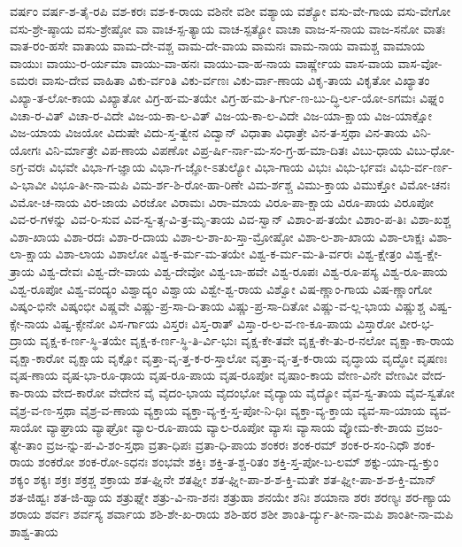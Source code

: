 {ವರ್ಷಂ
ವರ್ಷ-ಶ-ತೈ-ರಪಿ
ವಶ-ಕರಃ
ವಶ-ಕ-ರಾಯ
ವಶಿನೇ
ವಶೀ
ವಶ್ಯಾಯ
ವಶ್ಯೋ
ವಸು-ವೇ-ಗಾಯ
ವಸು-ವೇಗೋ
ವಸು-ಶ್ರೇ-ಷ್ಠಾಯ
ವಸು-ಶ್ರೇಷ್ಠೋ
ವಾ
ವಾಚ-ಸ್ಪ-ತ್ಯಾಯ
ವಾಚ-ಸ್ಪತ್ಯೋ
ವಾಚಾ
ವಾಜ-ಸ-ನಾಯ
ವಾಜ-ಸನೋ
ವಾತಃ
ವಾತ-ರಂ-ಹಸೇ
ವಾತಾಯ
ವಾಮ-ದೇ-ವಶ್ಚ
ವಾಮ-ದೇ-ವಾಯ
ವಾಮನಃ
ವಾಮ-ನಾಯ
ವಾಮಶ್ಚ
ವಾಮಾಯ
ವಾಯುಃ
ವಾಯು-ರ-ರ್ಯಮಾ
ವಾಯು-ವಾ-ಹನಃ
ವಾಯು-ವಾ-ಹ-ನಾಯ
ವಾರ್ಷ್ಣೇಯ
ವಾಸ-ವಾಯ
ವಾಸ-ವೋ-ಽಮರಃ
ವಾಸು-ದೇವ
ವಾಹಿತಾ
ವಿಕು-ರ್ವಂತಿ
ವಿಕು-ರ್ವಣಃ
ವಿಕು-ರ್ವಾ-ಣಾಯ
ವಿಕೃ-ತಾಯ
ವಿಕೃತೋ
ವಿಖ್ಯಾತಂ
ವಿಖ್ಯಾ-ತ-ಲೋ-ಕಾಯ
ವಿಖ್ಯಾತೋ
ವಿಗ್ರ-ಹ-ಮ-ತಯೇ
ವಿಗ್ರ-ಹ-ಮ-ತಿ-ರ್ಗು-ಣ-ಬು-ದ್ಧಿ-ರ್ಲ-ಯೋ-ಽಗಮಃ
ವಿಘ್ನಂ
ವಿಚಾ-ರ-ವಿತ್
ವಿಚಾ-ರ-ವಿದೇ
ವಿಜ-ಯ-ಕಾ-ಲ-ವಿತ್
ವಿಜ-ಯ-ಕಾ-ಲ-ವಿದೇ
ವಿಜ-ಯಾ-ಕ್ಷಾಯ
ವಿಜ-ಯಾಕ್ಷೋ
ವಿಜ-ಯಾಯ
ವಿಜಯೋ
ವಿದುಷೇ
ವಿದು-ಸ್ತ-ತ್ವೇನ
ವಿದ್ವಾನ್
ವಿಧಾತಾ
ವಿಧಾತ್ರೇ
ವಿನ-ತ-ಸ್ತಥಾ
ವಿನ-ತಾಯ
ವಿನಿ-ಯೋಗಃ
ವಿನಿ-ರ್ಮಾತ್ರೇ
ವಿಪ-ಣಾಯ
ವಿಪಣೋ
ವಿಪ್ರ-ರ್ಷಿ-ರ್ನಾ-ಮ-ಸಂ-ಗ್ರ-ಹ-ಮಾ-ದಿತಃ
ವಿಬು-ಧಾಯ
ವಿಬು-ಧೋ-ಽಗ್ರ-ವರಃ
ವಿಭವೇ
ವಿಭಾ-ಗ-ಜ್ಞಾಯ
ವಿಭಾ-ಗ-ಜ್ಞೋ-ಽತುಲ್ಯೋ
ವಿಭಾ-ಗಾಯ
ವಿಭುಃ
ವಿಭು-ರ್ಭವಃ
ವಿಭು-ರ್ವ-ರ್ಣ-ವಿ-ಭಾವೀ
ವಿಭೂ-ತೀ-ನಾ-ಮಪಿ
ವಿಮ-ರ್ಶ-ಶಿ-ರೋ-ಹಾ-ರಿಣೇ
ವಿಮ-ರ್ಶಶ್ಚ
ವಿಮು-ಕ್ತಾಯ
ವಿಮುಕ್ತೋ
ವಿಮೋ-ಚನಃ
ವಿಮೋ-ಚ-ನಾಯ
ವಿರ-ಜಾಯ
ವಿರಜೋ
ವಿರಾಮಃ
ವಿರಾ-ಮಾಯ
ವಿರೂ-ಪಾ-ಕ್ಷಾಯ
ವಿರೂ-ಪಾಯ
ವಿರೂಪೋ
ವಿವ-ರ-ಗಳನ್ನು
ವಿವ-ರಿ-ಸುವ
ವಿವ-ಸ್ವ-ತ್ಸ-ವಿ-ತ್ರ-ಮೃ-ತಾಯ
ವಿವ-ಸ್ವಾನ್
ವಿಶಾಂ-ಪ-ತಯೇ
ವಿಶಾಂ-ಪ-ತಿಃ
ವಿಶಾ-ಖಶ್ಚ
ವಿಶಾ-ಖಾಯ
ವಿಶಾ-ರದಃ
ವಿಶಾ-ರ-ದಾಯ
ವಿಶಾ-ಲ-ಶಾ-ಖ-ಸ್ತಾ-ಮ್ರೋಷ್ಠೋ
ವಿಶಾ-ಲ-ಶಾ-ಖಾಯ
ವಿಶಾ-ಲಾಕ್ಷಃ
ವಿಶಾ-ಲಾ-ಕ್ಷಾಯ
ವಿಶಾ-ಲಾಯ
ವಿಶಾಲೋ
ವಿಶ್ವ-ಕ-ರ್ಮ-ಮ-ತಯೇ
ವಿಶ್ವ-ಕ-ರ್ಮ-ಮ-ತಿ-ರ್ವರಃ
ವಿಶ್ವ-ಕ್ಷೇತ್ರಂ
ವಿಶ್ವ-ಕ್ಷೇ-ತ್ರಾಯ
ವಿಶ್ವ-ದೇವಃ
ವಿಶ್ವ-ದೇ-ವಾಯ
ವಿಶ್ವ-ದೇವೋ
ವಿಶ್ವ-ಬಾ-ಹವೇ
ವಿಶ್ವ-ರೂಪಃ
ವಿಶ್ವ-ರೂ-ಪಸ್ಯ
ವಿಶ್ವ-ರೂ-ಪಾಯ
ವಿಶ್ವ-ರೂಪೋ
ವಿಶ್ವ-ವಂದ್ಯಂ
ವಿಶ್ವಾದ್ಯಂ
ವಿಶ್ವಾಯ
ವಿಶ್ವೇ-ಶ್ವ-ರಾಯ
ವಿಶ್ವೋ
ವಿಷ-ಣ್ಣಾಂ-ಗಾಯ
ವಿಷ-ಣ್ಣಾಂಗೋ
ವಿಷ್ಕಂ-ಭಿನೇ
ವಿಷ್ಕಂಭೀ
ವಿಷ್ಣವೇ
ವಿಷ್ಣು-ಪ್ರ-ಸಾ-ದಿ-ತಾಯ
ವಿಷ್ಣು-ಪ್ರ-ಸಾ-ದಿತೋ
ವಿಷ್ಣು-ವ-ಲ್ಲ-ಭಾಯ
ವಿಷ್ಣುಶ್ಚ
ವಿಷ್ವ-ಕ್ಸೇ-ನಾಯ
ವಿಷ್ವ-ಕ್ಸೇನೋ
ವಿಸ-ರ್ಗಾಯ
ವಿಸ್ತರಃ
ವಿಸ್ತ-ರಾತ್
ವಿಸ್ತಾ-ರ-ಲ-ವ-ಣ-ಕೂ-ಪಾಯ
ವಿಸ್ತಾರೋ
ವೀರ-ಭ-ದ್ರಾಯ
ವೃಕ್ಷ-ಕ-ರ್ಣ-ಸ್ಥಿ-ತಯೇ
ವೃಕ್ಷ-ಕ-ರ್ಣ-ಸ್ಥಿ-ತಿ-ರ್ವಿ-ಭುಃ
ವೃಕ್ಷ-ಕೇ-ತವೇ
ವೃಕ್ಷ-ಕೇ-ತು-ರ-ನಲೋ
ವೃಕ್ಷಾ-ಕಾ-ರಾಯ
ವೃಕ್ಷಾ-ಕಾರೋ
ವೃಕ್ಷಾಯ
ವೃಕ್ಷೋ
ವೃತ್ತಾ-ವೃ-ತ್ತ-ಕ-ರ-ಸ್ತಾಲೋ
ವೃತ್ತಾ-ವೃ-ತ್ತ-ಕ-ರಾಯ
ವೃದ್ಧಾಯ
ವೃದ್ಧೋ
ವೃಷಣಃ
ವೃಷ-ಣಾಯ
ವೃಷ-ಭಾ-ರೂ-ಢಾಯ
ವೃಷ-ರೂ-ಪಾಯ
ವೃಷ-ರೂಪೋ
ವೃಷಾಂ-ಕಾಯ
ವೇಣ-ವಿನೇ
ವೇಣವೀ
ವೇದ-ಕಾ-ರಾಯ
ವೇದ-ಕಾರೋ
ವೇದೇನ
ವೈ
ವೈದಂ-ಭಾಯ
ವೈದಂಭೋ
ವೈದ್ಯಾಯ
ವೈದ್ಯೋ
ವೈವ-ಸ್ವ-ತಾಯ
ವೈವ-ಸ್ವತೋ
ವೈಶ್ರ-ವ-ಣ-ಸ್ತಥಾ
ವೈಶ್ರ-ವ-ಣಾಯ
ವ್ಯಕ್ತಾಯ
ವ್ಯಕ್ತಾ-ವ್ಯ-ಕ್ತ-ಸ್ತ-ಪೋ-ನಿ-ಧಿಃ
ವ್ಯಕ್ತಾ-ವ್ಯ-ಕ್ತಾಯ
ವ್ಯವ-ಸಾ-ಯಾಯ
ವ್ಯವ-ಸಾಯೋ
ವ್ಯಾಘ್ರಾಯ
ವ್ಯಾಘ್ರೋ
ವ್ಯಾಲ-ರೂ-ಪಾಯ
ವ್ಯಾಲ-ರೂಪೋ
ವ್ಯಾಸಃ
ವ್ಯಾಸಾಯ
ವ್ಯೋಮ-ಕೇ-ಶಾಯ
ವ್ರಜಂ-ತ್ಯೇ-ತಾಂ
ವ್ರಜ-ನ್ನು-ಪ-ವಿ-ಶಂ-ಸ್ತಥಾ
ವ್ರತಾ-ಧಿಪಃ
ವ್ರತಾ-ಧಿ-ಪಾಯ
ಶಂಕರಃ
ಶಂಕ-ರಮ್
ಶಂಕ-ರ-ಸಂ-ನಿಧೌ
ಶಂಕ-ರಾಯ
ಶಂಕರೋ
ಶಂಕ-ರೋ-ಽಧನಃ
ಶಂಭವೇ
ಶಕ್ತಿಃ
ಶಕ್ತಿ-ತ-ಶ್ಚ-ರಿತಂ
ಶಕ್ತಿ-ಸ್ತ-ಪೋ-ಬ-ಲಮ್
ಶಕ್ನು-ಯಾ-ದ್ವ-ಕ್ತುಂ
ಶಕ್ಯಂ
ಶಕ್ಯಃ
ಶಕ್ರಃ
ಶಕ್ರಶ್ಚ
ಶಕ್ರಾಯ
ಶತ-ಘ್ನಿನೇ
ಶತಘ್ನೀ
ಶತ-ಘ್ನೀ-ಪಾ-ಶ-ಶ-ಕ್ತಿ-ಮತೇ
ಶತ-ಘ್ನೀ-ಪಾ-ಶ-ಶ-ಕ್ತಿ-ಮಾನ್
ಶತ-ಜಿಹ್ವಃ
ಶತ-ಜಿ-ಹ್ವಾಯ
ಶತ್ರುಘ್ನೇ
ಶತ್ರು-ವಿ-ನಾ-ಶನಃ
ಶತ್ರುಹಾ
ಶನಯೇ
ಶನಿಃ
ಶಯಾನಾ
ಶರಃ
ಶರಣ್ಯಃ
ಶರ-ಣ್ಯಾಯ
ಶರಾಯ
ಶರ್ವಃ
ಶರ್ವಸ್ಯ
ಶರ್ವಾಯ
ಶಶಿ-ಶೇ-ಖ-ರಾಯ
ಶಶಿ-ಹರ
ಶಶೀ
ಶಾಂತಿ-ರ್ದ್ಯು-ತೀ-ನಾ-ಮಪಿ
ಶಾಂತೀ-ನಾ-ಮಪಿ
ಶಾಶ್ವ-ತಾಯ
}
